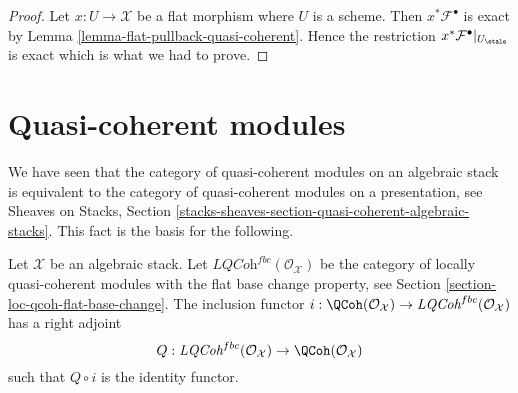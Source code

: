 \begin{proof}
Let $x : U \to \mathcal{X}$ be a flat morphism where $U$ is a scheme.
Then $x^*\mathcal{F}^\bullet$ is exact by
Lemma \ref{lemma-flat-pullback-quasi-coherent}.
Hence the restriction $x^*\mathcal{F}^\bullet|_{U_\etale}$
is exact which is what we had to prove.
\end{proof}





\section{Quasi-coherent modules}
\label{section-quasi-coherent}

\noindent
We have seen that the category of quasi-coherent modules on an algebraic
stack is equivalent to the category of quasi-coherent modules on a
presentation, see
Sheaves on Stacks, Section
\ref{stacks-sheaves-section-quasi-coherent-algebraic-stacks}.
This fact is the basis for the following.

\begin{lemma}
\label{lemma-adjoint}
Let $\mathcal{X}$ be an algebraic stack. Let
$\textit{LQCoh}^{fbc}(\mathcal{O}_\mathcal{X})$
be the category of locally quasi-coherent modules with the
flat base change property, see
Section \ref{section-loc-qcoh-flat-base-change}.
The inclusion functor
$i : \QCoh(\mathcal{O}_\mathcal{X}) \to
\textit{LQCoh}^{fbc}(\mathcal{O}_\mathcal{X})$
has a right adjoint
$$
Q : \textit{LQCoh}^{fbc}(\mathcal{O}_\mathcal{X}) \to
\QCoh(\mathcal{O}_\mathcal{X})
$$
such that $Q \circ i$ is the identity functor.
\end{lemma}

